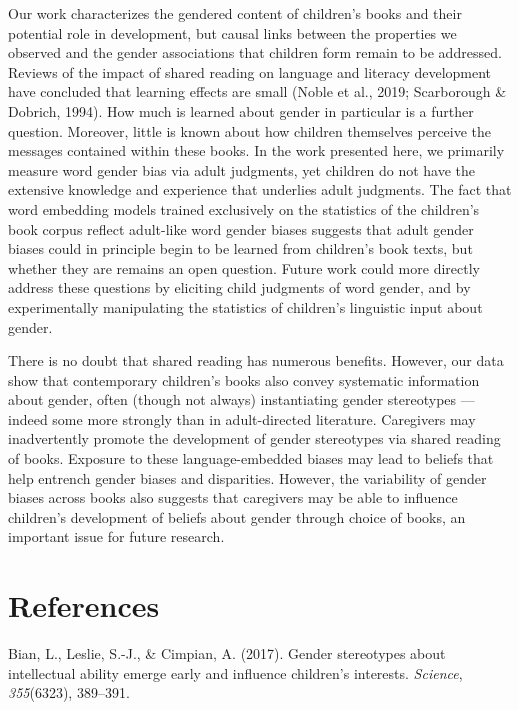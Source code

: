 \documentclass[
  english,
  ,man,floatsintext]{apa6}
\begin{document}
Our work characterizes the gendered content of children's books and their potential role in development, but causal links between the properties we observed and the gender associations that children form remain to be addressed. Reviews of the impact of shared reading on language and literacy development have concluded that learning effects are small (Noble et al., 2019; Scarborough \& Dobrich, 1994). How much is learned about gender in particular is a further question. Moreover, little is known about how children themselves perceive the messages contained within these books. In the work presented here, we primarily measure word gender bias via adult judgments, yet children do not have the extensive knowledge and experience that underlies adult judgments. The fact that word embedding models trained exclusively on the statistics of the children's book corpus reflect adult-like word gender biases suggests that adult gender biases could in principle begin to be learned from children's book texts, but whether they are remains an open question. Future work could more directly address these questions by eliciting child judgments of word gender, and by experimentally manipulating the statistics of children's linguistic input about gender.

There is no doubt that shared reading has numerous benefits. However, our data show that contemporary children's books also convey systematic information about gender, often (though not always) instantiating gender stereotypes --- indeed some more strongly than in adult-directed literature. Caregivers may inadvertently promote the development of gender stereotypes via shared reading of books. Exposure to these language-embedded biases may lead to beliefs that help entrench gender biases and disparities. However, the variability of gender biases across books also suggests that caregivers may be able to influence children's development of beliefs about gender through choice of books, an important issue for future research.

\newpage

\hypertarget{references}{%
\section{References}\label{references}}

\setlength{\parindent}{-0.5in}
\setlength{\leftskip}{0.5in}

\hypertarget{refs}{}
\leavevmode\hypertarget{ref-bian2017gender}{}%
Bian, L., Leslie, S.-J., \& Cimpian, A. (2017). Gender stereotypes about intellectual ability emerge early and influence children's interests. \emph{Science}, \emph{355}(6323), 389--391.
\end{document}
